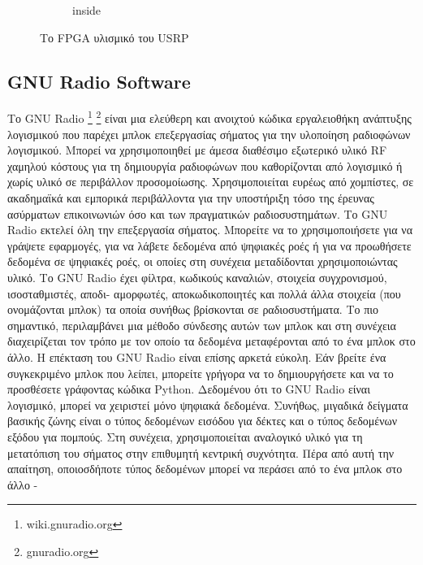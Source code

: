 \documentclass[12pt]{report}
\begin{document}
\begin{figure}[h]
\begin{subfigure}{0.3\linewidth}
                        \caption{inside}
                        \label{img:USRPin}
                     \end{subfigure}
                \caption{Το FPGA υλισμικό του USRP}
                \label{fig:USRP}
            \end{figure}

        \subsection{\textsf{GNU Radio Software}}
            Το GNU Radio \footnote{wiki.gnuradio.org} \footnote{gnuradio.org} είναι μια ελεύθερη 
            και ανοιχτού κώδικα εργαλειοθήκη ανάπτυξης λογισμικού που παρέχει μπλοκ επεξεργασίας 
            σήματος για την υλοποίηση ραδιοφώνων λογισμικού. Μπορεί να χρησιμοποιηθεί με άμεσα 
            διαθέσιμο εξωτερικό υλικό RF χαμηλού κόστους για τη δημιουργία ραδιοφώνων που 
            καθορίζονται από λογισμικό ή χωρίς υλικό σε περιβάλλον προσομοίωσης. 
            Χρησιμοποιείται ευρέως από χομπίστες, σε ακαδημαϊκά και εμπορικά
            περιβάλλοντα για την υποστήριξη τόσο της έρευνας ασύρματων επικοινωνιών όσο και των
            πραγματικών ραδιοσυστημάτων. Το GNU Radio εκτελεί όλη την επεξεργασία σήματος. Μπορείτε
            να το χρησιμοποιήσετε για να γράψετε εφαρμογές, για να λάβετε δεδομένα από ψηφιακές ροές
            ή για να προωθήσετε δεδομένα σε ψηφιακές ροές, οι οποίες στη συνέχεια μεταδίδονται
            χρησιμοποιώντας υλικό. Το GNU Radio έχει φίλτρα, κωδικούς καναλιών, στοιχεία
            συγχρονισμού, ισοσταθμιστές, αποδι- αμορφωτές, αποκωδικοποιητές και πολλά άλλα στοιχεία
            (που ονομάζονται μπλοκ) τα οποία συνήθως βρίσκονται σε ραδιοσυστήματα. Το πιο σημαντικό,
            περιλαμβάνει μια μέθοδο σύνδεσης αυτών των μπλοκ και στη συνέχεια διαχειρίζεται τον
            τρόπο με τον οποίο τα δεδομένα μεταφέρονται από το ένα μπλοκ στο άλλο. Η επέκταση του
            GNU Radio είναι επίσης αρκετά εύκολη. Εάν βρείτε ένα συγκεκριμένο μπλοκ που λείπει,
            μπορείτε γρήγορα να το δημιουργήσετε και να το προσθέσετε γράφοντας κώδικα Python.
            Δεδομένου ότι το GNU Radio είναι λογισμικό, μπορεί να χειριστεί μόνο ψηφιακά δεδομένα.
            Συνήθως, μιγαδικά δείγματα βασικής ζώνης είναι ο τύπος δεδομένων εισόδου για δέκτες
            και ο τύπος δεδομένων εξόδου για πομπούς. Στη συνέχεια, χρησιμοποιείται αναλογικό υλικό
            για τη μετατόπιση του σήματος στην επιθυμητή κεντρική συχνότητα. Πέρα από αυτή την
            απαίτηση, οποιοσδήποτε τύπος δεδομένων μπορεί να περάσει από το ένα μπλοκ στο άλλο -
\end{document}
